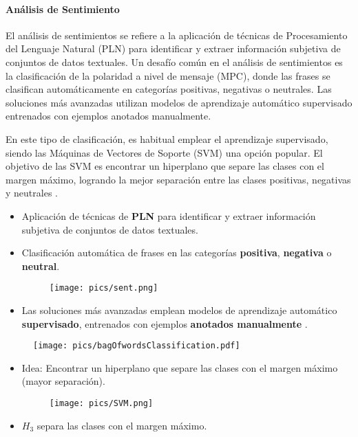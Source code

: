 \documentclass{book}
\begin{document}
\paragraph{Análisis de Sentimiento}

El análisis de sentimientos se refiere a la aplicación de técnicas de Procesamiento del Lenguaje Natural (PLN) para identificar y extraer información subjetiva de conjuntos de datos textuales. Un desafío común en el análisis de sentimientos es la clasificación de la polaridad a nivel de mensaje (MPC), donde las frases se clasifican automáticamente en categorías positivas, negativas o neutrales. Las soluciones más avanzadas utilizan modelos de aprendizaje automático supervisado entrenados con ejemplos anotados manualmente.

En este tipo de clasificación, es habitual emplear el aprendizaje supervisado, siendo las Máquinas de Vectores de Soporte (SVM) una opción popular. El objetivo de las SVM es encontrar un hiperplano que separe las clases con el margen máximo, logrando la mejor separación entre las clases positivas, negativas y neutrales \cite{jacobbook}.

\begin{itemize}
  \item Aplicación de técnicas de \textbf{PLN} para identificar y extraer información subjetiva de conjuntos de datos textuales.
  \item Clasificación automática de frases en las categorías \textcolor[rgb]{0.00,0.00,1.00}{\textbf{positiva}}, \textcolor[rgb]{1.00,0.00,0.00}{\textbf{negativa}} o \textcolor[rgb]{0.00,1.00,0.00}{\textbf{neutral}}.

     \begin{figure}[h]
        	\texttt{[image: pics/sent.png]}
        \end{figure}

  \item Las soluciones más avanzadas emplean modelos de aprendizaje automático \textbf{supervisado}, entrenados con ejemplos \textbf{anotados manualmente} \cite{Mohammad2013}.
\end{itemize}


\begin{figure}[h]
        	\texttt{[image: pics/bagOfwordsClassification.pdf]}
        \end{figure}


\begin{itemize}


\item Idea: Encontrar un hiperplano que separe las clases con el margen máximo (mayor separación).

     \begin{figure}[h]
        	\texttt{[image: pics/SVM.png]}
        \end{figure}

\item $H_3$ separa las clases con el margen máximo.

\end{itemize}
\end{document}
